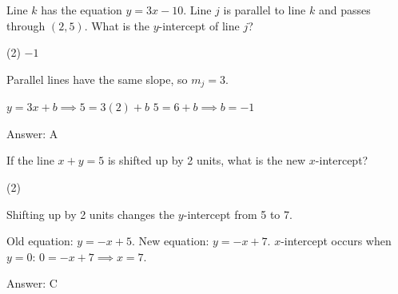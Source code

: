 \documentclass[11pt,paper=a4,answers]{exam}
\begin{document}
\begin{questions}
\vspace{1cm}

\question
Line $k$ has the equation $y = 3x - 10$. Line $j$ is parallel to line $k$ and passes through $(2, 5)$. What is the $y$-intercept of line $j$?
\begin{tasks}(2)
\task $-1$   
\end{tasks}

\begin{solution}
Parallel lines have the same slope, so $m_j = 3$.
\vspace{5pt}
\begin{center}
$y = 3x + b \implies 5 = 3(2) + b$
\vspace{5pt}
$5 = 6 + b \implies b = -1$
\end{center}
\vspace{5pt}
Answer: \colorbox{yellow!100}{A}
\end{solution}

\vspace{1cm}

\question
\begin{center}
\end{center}
If the line $x + y = 5$ is shifted up by 2 units, what is the new $x$-intercept?
\begin{tasks}(2)
   
\end{tasks}

\begin{solution}
Shifting up by 2 units changes the $y$-intercept from 5 to 7.
\vspace{5pt}
\begin{center}
Old equation: $y = -x + 5$.
\vspace{5pt}
New equation: $y = -x + 7$.
\vspace{5pt}
$x$-intercept occurs when $y=0$: $0 = -x + 7 \implies x = 7$.
\end{center}
\vspace{5pt}
Answer: \colorbox{yellow!100}{C}
\end{solution}


\end{questions}
\end{document}
